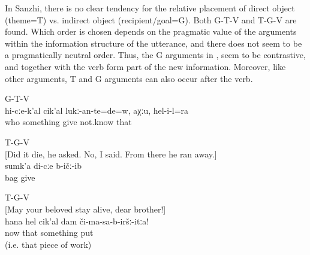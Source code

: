 In Sanzhi, there is no clear tendency for the relative placement of direct object (theme=T) vs. indirect object (recipient\slash goal=G). Both G-T-V and T-G-V are found. Which order is chosen depends on the pragmatic value of the arguments within the information structure of the utterance, and there does not seem to be a pragmatically neutral order. Thus, the G arguments in ,  seem to be contrastive, and together with the verb form part of the new information.  Moreover, like other arguments, T and G arguments can also occur after the verb.
%
\begin{exe}
	\ex	G-T-V\\\label{ex:‎‎He had also to give something to somebody, I don't know GTV}%
	\gll	hi-cːe-k'al	cik'al	lukː-an-te=de=w,	aχːu,	hel-i-l=ra\\
		who	something	give	not.know that\\
	\glt	{}

	\ex	T-G-V\\\label{ex:‎‎From there he ran away, gave me his bag TGV}%
		[Did it die, he asked. No, I said. ‎‎From there he ran away.]\\
	\gll	sumk'a	di-cːe	b-ičː-ib\\
		bag		give\\
	\glt	{}

	\ex	T-G-V\\\label{ex:Do not put that thing on me!}%
		‎[May your beloved stay alive, dear brother!]\\
	\gll	hana	hel	cik'al	dam	či-ma-sa-b-iršː-itːa!\\
		now	that	something		put\\
	\glt	{} (i.e. that piece of work)
\end{exe}

